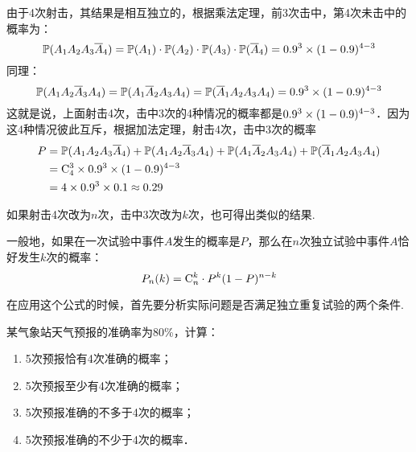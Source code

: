 由于4次射击，其结果是相互独立的，根据乘法定理，前3次击中，第4次未击中的概率为：
\[\mathbb{P}(A_1A_2A_3\overline{A}_4)=\mathbb{P}(A_1)\cdot \mathbb{P}(A_2)\cdot \mathbb{P}(A_3)\cdot \mathbb{P}(\overline{A}_4)=0.9^3\times(1-0.9)^{4-3}\]
同理：
$$\mathbb{P}(A_1A_2\overline{A}_3A_4)=\mathbb{P}(A_1\overline{A}_2A_3A_4)=\mathbb{P}(\overline{A}_1A_2A_3A_4)=0.9^3\times(1-0.9)^{4-3}$$
这就是说，上面射击4次，击中3次的4种情况的概率都是$0.9^3\times(1-0.9)^{4-3}$．因为这4种情况彼此互斥，根据加法定理，射击4次，击中3次的概率
\[\begin{split}
    P&=\mathbb{P}(A_1A_2A_3\overline{A}_4)+\mathbb{P}(A_1A_2\overline{A}_3A_4)+\mathbb{P}(A_1\overline{A}_2A_3A_4)+\mathbb{P}(\overline{A}_1A_2A_3A_4)\\
    &={\rm C}^{3}_{4}\times 0.9^3\times(1-0.9)^{4-3}\\
    &=4\times 0.9^3\times0.1\approx 0.29
\end{split}\]

如果射击4次改为$n$次，击中3次改为$k$次，也可得出类似的结果.

一般地，如果在一次试验中事件$A$发生的概率是$P$，那么在$n$次独立试验中事件$A$恰好发生$k$次的概率：
\[P_n(k)={\rm C}^{k}_{n}\cdot P^k(1-P)^{n-k}\]

在应用这个公式的时候，首先要分析实际问题是否满足独立重复试验的两个条件.


\begin{example}
    某气象站天气预报的准确率为80\%，计算：
\begin{enumerate}[(1)]
\item 5次预报恰有4次准确的概率；
\item 5次预报至少有4次准确的概率；
\item 5次预报准确的不多于4次的概率；
\item 5次预报准确的不少于4次的概率．
\end{enumerate}

\end{example}

